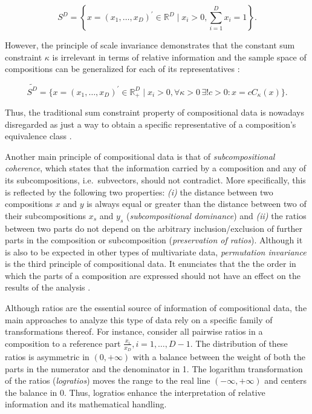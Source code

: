 \documentclass[
  openany]{book}
\begin{document}
\begin{equation} 
  S^D = \left\{ x = (x_1, \ldots, x_D)^\prime \in \mathbb{R}^D \mid x_i > 0, \sum^{D}_{i=1} x_i = 1 \right\}.
  \label{eq:simplex}
\end{equation}

However, the principle of scale invariance demonstrates that the constant sum constraint \(\kappa\) is irrelevant in terms of relative information and the sample space of compositions can be generalized for each of its representatives \autocite{Filzmoser2018a}:

\begin{equation} 
  \tilde{S^D} = \bigg\{ x = (x_1, \ldots, x_D)^\prime \in \mathbb{R}^D_+ \mid x_i > 0, \forall \kappa > 0 \, \exists ! c > 0: x = cC_\kappa(x) \bigg\}.
  \label{eq:samplespace}
\end{equation}

Thus, the traditional sum constraint property of compositional data \autocite{Chayes1960} is nowadays disregarded as just a way to obtain a specific representative of a composition's equivalence class \autocite{Egozcue2019}.

Another main principle of compositional data is that of \emph{subcompositional coherence}, which states that the information carried by a composition and any of its subcompositions, i.e.~subvectors, should not contradict. More specifically, this is reflected by the following two properties: \emph{(i)} the distance between two compositions \(x\) and \(y\) is always equal or greater than the distance between two of their subcompositions \(x_s\) and \(y_s\) (\emph{subcompositional dominance}) and \emph{(ii)} the ratios between two parts do not depend on the arbitrary inclusion/exclusion of further parts in the composition or subcomposition (\emph{preservation of ratios}). Although it is also to be expected in other types of multivariate data, \emph{permutation invariance} is the third principle of compositional data. It enunciates that the the order in which the parts of a composition are expressed should not have an effect on the results of the analysis \autocite{Pawlowsky-Glahn2015c,Filzmoser2018b}.

Although ratios are the essential source of information of compositional data, the main approaches to analyze this type of data rely on a specific family of transformations thereof. For instance, consider all pairwise ratios in a composition to a reference part \(\frac{x_i}{x_D}, i = 1, \ldots, D - 1\). The distribution of these ratios is asymmetric in \((0, +\infty)\) with a balance between the weight of both the parts in the numerator and the denominator in 1. The logarithm transformation of the ratios (\emph{logratios}) moves the range to the real line \((-\infty, +\infty)\) and centers the balance in \(0\). Thus, logratios enhance the interpretation of relative information and its mathematical handling.
\end{document}
